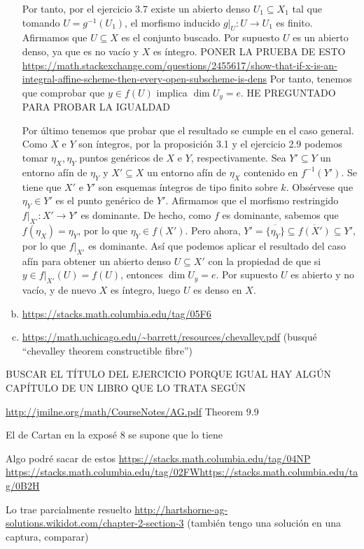 \documentclass[twoside]{article}
\begin{document}
\begin{solucion}
\begin{enumerate}[(a)]
Por tanto, por el ejercicio 3.7 existe un abierto denso $U_1\subseteq X_1$ tal que tomando $U=g^{-1}(U_1)$, el morfismo inducido $g|_U:U\to U_1$ es finito. Afirmamos que $U\subseteq X$ es el conjunto buscado. Por supuesto $U$ es un abierto denso, ya que es no vacío y $X$ es íntegro. PONER LA PRUEBA DE ESTO \url{https://math.stackexchange.com/questions/2455617/show-that-if-x-is-an-integral-affine-scheme-then-every-open-subscheme-is-dens} Por tanto, tenemos que comprobar que $y\in f(U)$ implica $\dim U_y=e$. HE PREGUNTADO PARA PROBAR LA IGUALDAD

Por último tenemos que probar que el resultado se cumple en el caso general. Como $X$ e $Y$ son íntegros, por la proposición 3.1 y el ejercicio 2.9 podemos tomar $\eta_X,\eta_Y$ puntos genéricos de $X$ e $Y$, respectivamente. Sea $Y'\subseteq Y$ un entorno afín de $\eta_Y$ y $X'\subseteq X$ un entorno afín de $\eta_X$ contenido en $f^{-1}(Y')$. Se tiene que $X'$ e $Y'$ son esquemas íntegros de tipo finito sobre $k$. Obsérvese que $\eta_Y\in Y'$ es el punto genérico de $Y'$. Afirmamos que el morfismo restringido $f|_{X'}:X'\to Y'$ es dominante. De hecho, como $f$ es dominante, sabemos que $f(\eta_X)=\eta_Y$, por lo que $\eta_Y\in f(X')$. Pero ahora, $Y'=\overline{\{\eta_Y\}}\subseteq \overline{f(X')}\subseteq Y'$, por lo que $f|_{X'}$ es dominante. Así que podemos aplicar el resultado del caso afín para obtener un abierto denso $U\subseteq X'$ con la propiedad de que si $y\in f|_{X'}(U)=f(U)$, entonces $\dim U_y=e$. Por supuesto $U$ es abierto y no vacío, y de nuevo $X$ es íntegro, luego $U$ es denso en $X$. 

\item \url{https://stacks.math.columbia.edu/tag/05F6}

\item \url{https://math.uchicago.edu/~barrett/resources/chevalley.pdf} (busqué ``chevalley theorem constructible fibre'')

\end{enumerate}
BUSCAR EL TÍTULO DEL EJERCICIO PORQUE IGUAL HAY ALGÚN CAPÍTULO DE UN LIBRO QUE LO TRATA SEGÚN 

\url{http://jmilne.org/math/CourseNotes/AG.pdf} Theorem 9.9

El de Cartan en la exposé 8 se supone que lo tiene

Algo podré sacar de estos \url{https://stacks.math.columbia.edu/tag/04NP} \url{https://stacks.math.columbia.edu/tag/02FW}\url{https://stacks.math.columbia.edu/tag/0B2H}

Lo trae parcialmente resuelto \url{http://hartshorne-ag-solutions.wikidot.com/chapter-2-section-3} (también tengo una solución en una captura, comparar)


\end{solucion}
\end{document}
